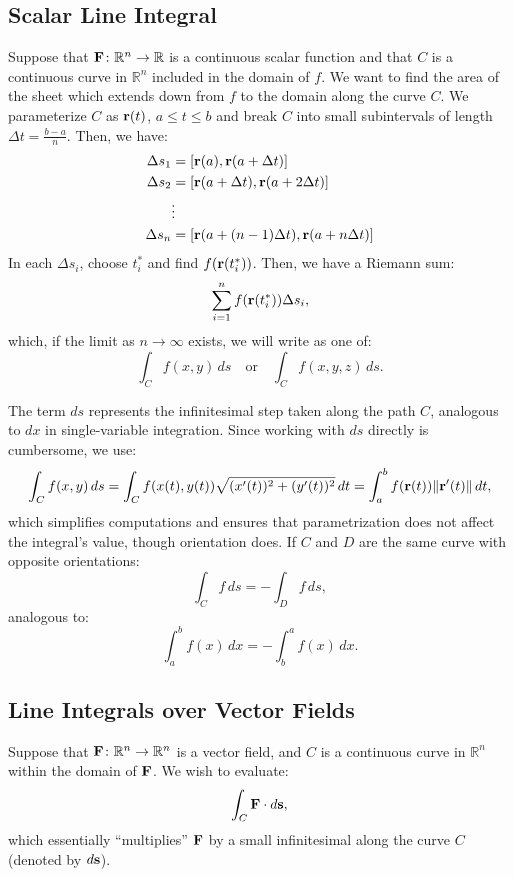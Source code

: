 \subsection{Scalar Line Integral}
Suppose that \( \mathbf{F} \colon \mathbb{R}^n \to \mathbb{R} \) is a continuous scalar function and that \( C \) is a continuous curve in \( \mathbb{R}^n \) included in the domain of \( f \). We want to find the area of the sheet which extends down from \( f \) to the domain along the curve \( C \). We parameterize \( C \) as \( \mathbf{r}(t) \), \( a \leq t \leq b \) and break \( C \) into small subintervals of length \( \Delta t = \frac{b-a}{n} \). Then, we have:
\begin{align*}
    \Delta s_1 &= [\mathbf{r}(a), \mathbf{r}(a + \Delta t)] \\
    \Delta s_2 &= [\mathbf{r}(a + \Delta t), \mathbf{r}(a + 2\Delta t)] \\
    &\vdots \\
    \Delta s_n &= [\mathbf{r}(a + (n - 1)\Delta t), \mathbf{r}(a + n\Delta t)]
\end{align*}
In each \( \Delta s_i \), choose \( t^*_i \) and find \( f(\mathbf{r}(t^*_i )) \). Then, we have a Riemann sum:
\[ \sum_{i=1}^{n} f(\mathbf{r}(t^*_i ))\Delta s_i, \]
which, if the limit as \( n \to \infty \) exists, we will write as one of:
\[ \int_C f(x, y) \, ds \quad \text{or} \quad \int_C f(x, y, z) \, ds. \]

The term \( ds \) represents the infinitesimal step taken along the path \( C \), analogous to \( dx \) in single-variable integration. Since working with \( ds \) directly is cumbersome, we use:
\[ \int_C f(x, y) \, ds = \int_C f(x(t), y(t)) \sqrt{(x'(t))^2 + (y'(t))^2} \, dt = \int_a^b f(\mathbf{r}(t)) \| \mathbf{r}'(t) \| \, dt, \]
which simplifies computations and ensures that parametrization does not affect the integral's value, though orientation does. If \( C \) and \( D \) are the same curve with opposite orientations:
\[ \int_C f \, ds = - \int_D f \, ds, \]
analogous to:
\[ \int_a^b f(x) \, dx = - \int_b^a f(x) \, dx. \]

\subsection{Line Integrals over Vector Fields}
Suppose that \( \mathbf{F} \colon \mathbb{R}^n \to \mathbb{R}^n \) is a vector field, and \( C \) is a continuous curve in \( \mathbb{R}^n \) within the domain of \( \mathbf{F} \). We wish to evaluate:
\[ \int_C \mathbf{F} \cdot d\mathbf{s}, \]
which essentially ``multiplies'' \(\mathbf{F}\) by a small infinitesimal along the curve \(C\) (denoted by \(d\mathbf{s}\)). \\

